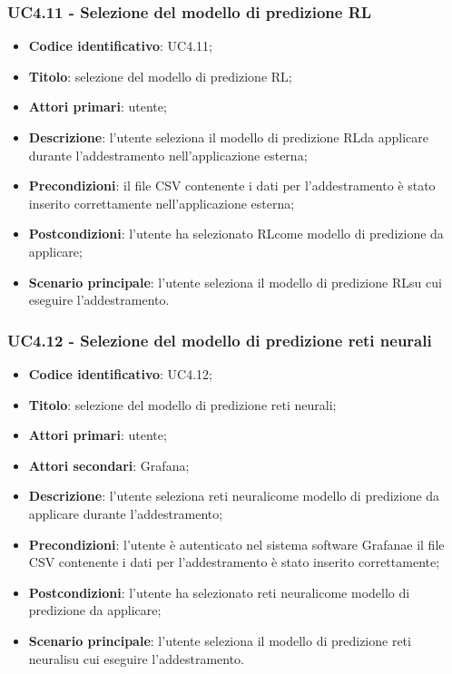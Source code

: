\subsubsection{UC4.11 - Selezione del modello di predizione RL}
\begin{itemize}
	\item \textbf{Codice identificativo}: UC4.11;
	\item \textbf{Titolo}: selezione del modello di predizione RL\glo;
	\item \textbf{Attori primari}: utente;
	\item \textbf{Descrizione}: l'utente seleziona il modello di predizione RL\glosp da applicare durante l'addestramento nell'applicazione esterna;
	\item \textbf{Precondizioni}: il file CSV contenente i dati per l'addestramento è stato inserito correttamente nell'applicazione esterna;
	\item \textbf{Postcondizioni}: l'utente ha selezionato RL\glosp come modello di predizione da applicare;
	\item \textbf{Scenario principale}: l'utente seleziona il modello di predizione RL\glosp su cui eseguire l'addestramento.
\end{itemize}
\subsubsection{UC4.12 - Selezione del modello di predizione reti neurali}
\begin{itemize}
	\item \textbf{Codice identificativo}: UC4.12;
	\item \textbf{Titolo}: selezione del modello di predizione reti neurali\glo;
	\item \textbf{Attori primari}: utente;
	\item \textbf{Attori secondari}: Grafana\glo;
	\item \textbf{Descrizione}: l'utente seleziona reti neurali\glosp come modello di predizione da applicare durante l'addestramento;
	\item \textbf{Precondizioni}: l'utente è autenticato nel sistema software Grafana\glosp e il file CSV contenente i dati per l'addestramento è stato inserito correttamente;
	\item \textbf{Postcondizioni}: l'utente ha selezionato reti neurali\glosp come modello di predizione da applicare;
	\item \textbf{Scenario principale}: l'utente seleziona il modello di predizione reti neurali\glosp su cui eseguire l'addestramento.
\end{itemize}
